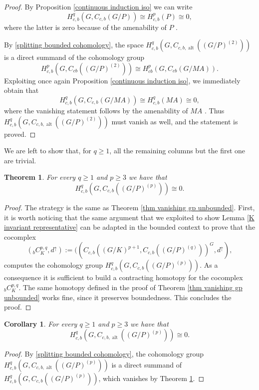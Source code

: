 \documentclass[a4paper]{amsart}
\newtheorem{thm}[lem]{Theorem}
\newtheorem{cor}[lem]{Corollary}
\theoremstyle{definition}
\theoremstyle{remark}
\theoremstyle{TheoremNum}
\DeclareMathOperator{\alt}{\mathrm{alt}}
\begin{document}
\begin{proof}
By Proposition \ref{continuous induction iso} we can write 
$$
H^q_{c,b}(G,C_{c,b}(G/P)) \cong H^p_{c,b}(P) \cong 0,
$$
where the latter is zero because of the amenability of $P$ \cite[Corollary 7.5.11]{Monodbook}. 


By  \eqref{splitting bounded cohomology}, the space $H^q_{c,b}(G,C_{c,b,\alt}((G/P)^{(2)}))$ is a direct summand of the cohomology group 
$$
H^p_{c,b}(G,C_{cb}((G/P)^{(2)})) \cong H^p_{cb}(G,C_{cb}(G/MA)).
$$
Exploiting once again Proposition \ref{continuous induction iso}, we immediately obtain that
$$
 H^q_{c,b}(G,C_{c,b}(G/MA)) \cong H^q_{c,b}(MA) \cong 0,
$$
where the vanishing statement follows by the amenability of $MA$ \cite[Corollary 7.5.11]{Monodbook}. Thus $H^q_{c,b}(G,C_{c,b,\alt}((G/P)^{(2)}))$ must vanish as well, and the statement is proved.
\end{proof}

We are left to show that, for $q \geq 1$, all the remaining columns but the first one are trivial.

\begin{thm}\label{thm vanishing gp bounded}
For every $q \geq 1$ and $p \geq 3$ we have that 
$$
H^q_{c,b}(G,C_{c,b}((G/P)^{(p)})) \cong 0. 
$$
\end{thm} 

\begin{proof}
The strategy is the same as Theorem \ref{thm vanishing gp unbounded}. First, it is worth noticing that the same argument that we exploited to show Lemma \ref{K invariant representative} can be adapted in the bounded context to prove that the cocomplex 
$$
(_bC_K^{p,q},d^\uparrow):=((C_{c,b}((G/K)^{p+1},C_{c,b}((G/P)^{(q)}))^G,d^\uparrow),
$$
computes the cohomology group $H^q_{c,b}(G,C_{c,b}((G/P)^{(p)}))$. As a consequence it is sufficient to build a contracting homotopy for the cocomplex $_bC_K^{p,q}$. The same homotopy defined in the proof of Theorem \ref{thm vanishing gp unbounded} works fine, since it preserves boundedness. This concludes the proof. 
\end{proof}

\begin{cor}\label{cor bounded 3 points}
For every $q \geq 1$ and $p \geq 3$ we have that
$$
H^q_{c,b}(G,C_{c,b,\alt}((G/P)^{(p)})) \cong 0.
$$
\end{cor}

\begin{proof}
By  \eqref{splitting bounded cohomology}, the cohomology group $H^q_{c,b}(G,C_{c,b,\alt}((G/P)^{(p)}))$ is a direct summand of $H^q_{c,b}(G,C_{c,b}((G/P)^{(p)}))$, which vanishes by Theorem \ref{thm vanishing gp bounded}.
\end{proof}
\end{document}

